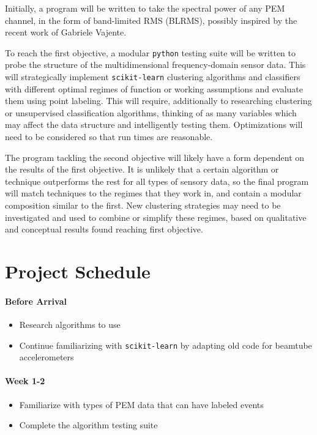 \documentclass[colorlinks=true,pdfstartview=FitV,linkcolor=blue,
            citecolor=red,urlcolor=magenta]{ligodoc}
\begin{document}
Initially, a program will be written to take the spectral power of any PEM channel, in the form of band-limited RMS (BLRMS), possibly inspired by the recent work of Gabriele Vajente\cite{vajente}.

To reach the first objective, a modular \texttt{python} testing suite will be written to probe the structure of the multidimensional frequency-domain sensor data.
This will strategically implement \texttt{scikit-learn} clustering algorithms and classifiers with different optimal regimes of function or working assumptions and evaluate them using point labeling. 
This will require, additionally to researching clustering or unsupervised classification algorithms, thinking of as many variables which may affect the data structure and intelligently testing them. 
Optimizations will need to be considered so that run times are reasonable.

The program tackling the second objective will likely have a form dependent on the results of the first objective.
It is unlikely that a certain algorithm or technique outperforms the rest for all types of sensory data, so the final program will match techniques to the regimes that they work in, and contain a modular composition similar to the first.
New clustering strategies may need to be investigated and used to combine or simplify these regimes, based on qualitative and conceptual results found reaching first objective.


\section{Project Schedule}
\paragraph{Before Arrival}
\begin{itemize}
\item Research algorithms to use
\item Continue familiarizing with \texttt{scikit-learn} by adapting old code for beamtube accelerometers
\end{itemize}
\paragraph{Week 1-2}
\begin{itemize}
\item Familiarize with types of PEM data that can have labeled events
\item Complete the algorithm testing suite
\end{itemize}
\end{document}
